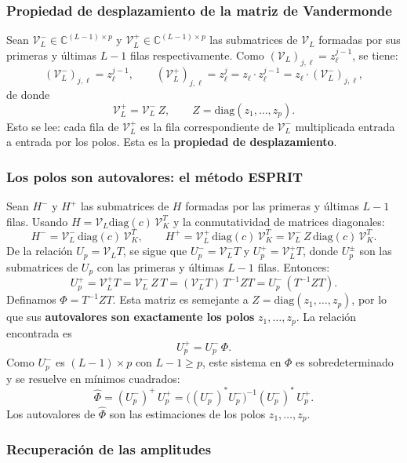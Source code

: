 \documentclass[12pt]{article}
\newcommand{\C}{\mathbb{C}}
\begin{document}
\subsubsection{Propiedad de desplazamiento de la matriz de Vandermonde}

Sean $\mathcal{V}_L^- \in \C^{(L-1)\times p}$ y $\mathcal{V}_L^+ \in \C^{(L-1)\times p}$ las submatrices de $\mathcal{V}_L$ formadas por sus primeras y últimas $L-1$ filas respectivamente. Como $(\mathcal{V}_L)_{j,\ell} = z_\ell^{j-1}$, se tiene:
\[
  (\mathcal{V}_L^-)_{j,\ell} = z_\ell^{j-1}, \qquad (\mathcal{V}_L^+)_{j,\ell} = z_\ell^{j} = z_\ell\cdot z_\ell^{j-1} = z_\ell \cdot (\mathcal{V}_L^-)_{j,\ell},
\]
de donde
\[
  \mathcal{V}_L^+ = \mathcal{V}_L^-\, Z, \qquad Z = \mathrm{diag}(z_1, \ldots, z_p).
\]
Esto se lee: cada fila de $\mathcal{V}_L^+$ es la fila correspondiente de $\mathcal{V}_L^-$ multiplicada entrada a entrada por los polos. Esta es la \textbf{propiedad de desplazamiento}.

\subsubsection{Los polos son autovalores: el método ESPRIT}

Sean $H^-$ y $H^+$ las submatrices de $H$ formadas por las primeras y últimas $L-1$ filas. Usando $H = \mathcal{V}_L \mathrm{diag}(c)\, \mathcal{V}_K^T$ y la conmutatividad de matrices diagonales:
\[
  H^- = \mathcal{V}_L^-\, \mathrm{diag}(c)\, \mathcal{V}_K^T, \qquad
  H^+ = \mathcal{V}_L^+\, \mathrm{diag}(c)\, \mathcal{V}_K^T
      = \mathcal{V}_L^-\, Z\, \mathrm{diag}(c)\, \mathcal{V}_K^T.
\]
De la relación $U_p = \mathcal{V}_L T$, se sigue que $U_p^- = \mathcal{V}_L^- T$ y $U_p^+ = \mathcal{V}_L^+ T$, donde $U_p^\pm$ son las submatrices de $U_p$ con las primeras y últimas $L-1$ filas. Entonces:
\[
  U_p^+ = \mathcal{V}_L^+ T = \mathcal{V}_L^-\, Z\, T = (\mathcal{V}_L^- T)\, T^{-1} Z T = U_p^-\, (T^{-1} Z T).
\]
Definamos $\Phi = T^{-1} Z T$. Esta matriz es semejante a $Z = \mathrm{diag}(z_1,\ldots,z_p)$, por lo que sus \textbf{autovalores son exactamente los polos} $z_1, \ldots, z_p$. La relación encontrada es
\[
  \boxed{U_p^+ = U_p^-\, \Phi.}
\]
Como $U_p^-$ es $(L-1)\times p$ con $L-1 \geq p$, este sistema en $\Phi$ es sobredeterminado y se resuelve en mínimos cuadrados:
\[
  \hat{\Phi} = (U_p^-)^+\, U_p^+ = \bigl((U_p^-)^* U_p^-\bigr)^{-1} (U_p^-)^*\, U_p^+.
\]
Los autovalores de $\hat{\Phi}$ son las estimaciones de los polos $z_1, \ldots, z_p$.

\subsubsection{Recuperación de las amplitudes}
\end{document}
